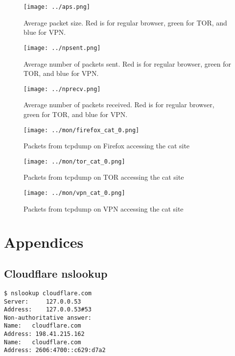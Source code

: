 \documentclass[11pt]{article}
\begin{document}
\begin{figure}[htbp]
\centering
\texttt{[image: ../aps.png]}
\caption{\label{fig:aps}
Average packet size.
Red is for regular browser, green for TOR, and blue for VPN.}
\end{figure}

\begin{figure}[htbp]
\centering
\texttt{[image: ../npsent.png]}
\caption{\label{fig:npsent}
Average number of packets sent.
Red is for regular browser, green for TOR, and blue for VPN.}
\end{figure}

\begin{figure}[htbp]
\centering
\texttt{[image: ../nprecv.png]}
\caption{\label{fig:nprecv}
Average number of packets received.
Red is for regular browser, green for TOR, and blue for VPN.}
\end{figure}

\begin{figure}[htbp]
\centering
\texttt{[image: ../mon/firefox\_cat\_0.png]}
\caption{\label{fig:ffcat0}
Packets from tcpdump on Firefox accessing the cat site}
\end{figure}

\begin{figure}[htbp]
\centering
\texttt{[image: ../mon/tor\_cat\_0.png]}
\caption{\label{fig:torcat0}
Packets from tcpdump on TOR accessing the cat site}
\end{figure}

\begin{figure}[htbp]
\centering
\texttt{[image: ../mon/vpn\_cat\_0.png]}
\caption{\label{fig:vpncat0}
Packets from tcpdump on VPN accessing the cat site}
\end{figure}

\appendix
\section{Appendices}
\subsection{Cloudflare nslookup}
\label{app:nslookup}

\begin{Verbatim}[obeytabs, tabsize=4]
$ nslookup cloudflare.com
Server:		127.0.0.53
Address:	127.0.0.53#53
Non-authoritative answer:
Name:	cloudflare.com
Address: 198.41.215.162
Name:	cloudflare.com
Address: 2606:4700::c629:d7a2
\end{Verbatim}
\end{document}
